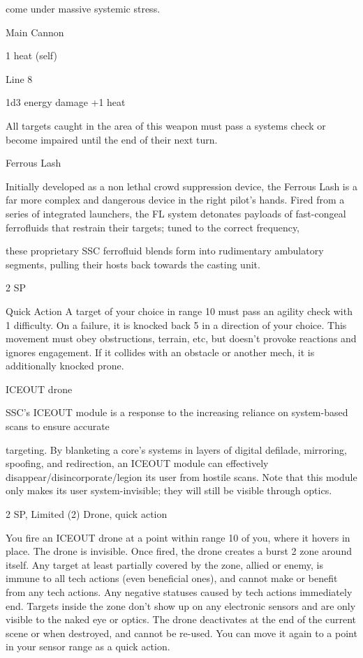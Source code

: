 come under massive systemic stress.

Main Cannon

1 heat (self)

Line 8

1d3 energy damage +1 heat

All targets caught in the area of this weapon must pass a systems check or become impaired
until the end of their next turn.


Ferrous Lash

Initially developed as a non lethal crowd suppression device, the Ferrous Lash is a far more complex and
dangerous device in the right pilot’s hands. Fired from a series of integrated launchers, the FL system
detonates payloads of fast-congeal ferrofluids that restrain their targets; tuned to the correct frequency,

these proprietary SSC ferrofluid blends form into rudimentary ambulatory segments, pulling their hosts
back towards the casting unit.

2 SP




Quick Action
A target of your choice in range 10 must pass an agility check with 1 difficulty. On a failure, it is
knocked back 5 in a direction of your choice. This movement must obey obstructions, terrain,
etc, but doesn't provoke reactions and ignores engagement. If it collides with an obstacle or
another mech, it is additionally knocked prone.


ICEOUT drone

SSC’s ICEOUT module is a response to the increasing reliance on system-based scans to ensure accurate

targeting. By blanketing a core’s systems in layers of digital defilade, mirroring, spoofing, and redirection,
an ICEOUT module can effectively disappear/disincorporate/legion its user from hostile scans. Note that
this module only makes its user system-invisible; they will still be visible through optics.

2 SP, Limited (2)
Drone, quick action

You fire an ICEOUT drone at a point within range 10 of you, where it hovers in place. The drone is
invisible. Once fired, the drone creates a burst 2 zone around itself. Any target at least partially
covered by the zone, allied or enemy, is immune to all tech actions (even beneficial ones), and
cannot make or benefit from any tech actions. Any negative statuses caused by tech actions
immediately end. Targets inside the zone don’t show up on any electronic sensors and are only
visible to the naked eye or optics. The drone deactivates at the end of the current scene or when
destroyed, and cannot be re-used. You can move it again to a point in your sensor range as a
quick action.


